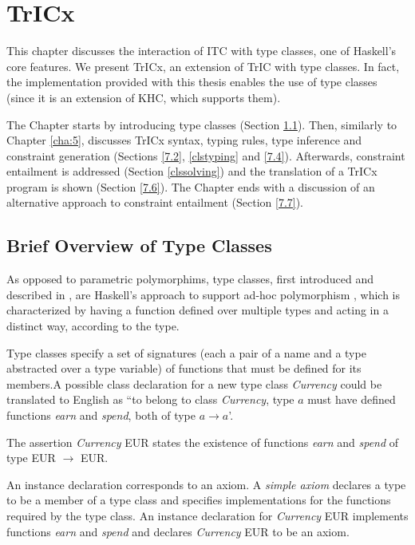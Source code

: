 \chapter{TrICx}
\label{cha:7}
This chapter discusses the interaction of ITC with type classes, one of Haskell's core features. We present TrICx, an extension of TrIC with type classes.  In fact, the implementation provided with this thesis enables the use of type classes (since it is an extension of KHC, which supports them).

The Chapter starts by introducing type classes (Section \ref{7.1}). Then, similarly to Chapter \ref{cha:5}, discusses TrICx syntax, typing rules, type inference and constraint generation (Sections \ref{7.2}, \ref{clstyping} and \ref{7.4}). Afterwards, constraint entailment is addressed (Section \ref{clssolving}) and the translation of a TrICx program is shown (Section \ref{7.6}). The Chapter ends with a discussion of an alternative approach to constraint entailment (Section \ref{7.7}).

\section{Brief Overview of Type Classes}
\label{7.1}
As opposed to parametric polymorphims, type classes, first introduced and described in \cite{adhoc}, are Haskell's approach to support ad-hoc polymorphism \cite{strachey}, which is characterized by having a function defined over multiple types and acting in a distinct way, according to the type.

Type classes specify a set of signatures (each a pair of a name and a type abstracted over a type variable) of functions that must be defined for its members.A possible class declaration for a new type class \textit{Currency} could be translated to English as ``to belong to class \textit{Currency}, type $a$ must have defined functions \textit{earn} and \textit{spend}, both of type $a \to a$'.

The assertion \textit{Currency} EUR states the existence of functions \textit{earn} and \textit{spend} of type EUR $\to$ EUR. 

An instance declaration corresponds to an axiom. A \textit{simple axiom} declares a type to be a member of a type class and specifies implementations for the functions required by the type class. An instance declaration for \textit{Currency} EUR implements functions \textit{earn} and \textit{spend} and declares \textit{Currency} EUR to be an axiom.

